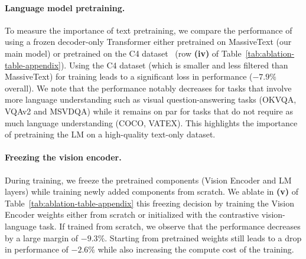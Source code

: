 \paragraph{Language model pretraining.}
To measure the importance of text pretraining, we compare the performance of using a frozen decoder-only Transformer either pretrained on MassiveText (our main model) or pretrained on the C4 dataset~\citep{t5} (row \textbf{(iv)} of Table~\ref{tab:ablation-table-appendix}).
Using the C4 dataset (which is smaller and less filtered than MassiveText) for training leads to a significant loss in performance ($-7.9\%$ overall).
We note that the performance notably decreases for tasks that involve more language understanding such as visual question-answering tasks (OKVQA, VQAv2 and MSVDQA) while it remains on par for tasks that do not require as much language understanding (COCO, VATEX).
This highlights the importance of pretraining the LM on a high-quality text-only dataset.


\paragraph{Freezing the vision encoder.} %
During \method{} training, we freeze the pretrained components (Vision Encoder and LM layers) while training newly added components from scratch.
We ablate in \textbf{(v)} of Table~\ref{tab:ablation-table-appendix} this freezing decision by training the Vision Encoder weights either from scratch or initialized with the contrastive vision-language task.
If trained from scratch, we observe that the performance decreases by a large margin of $-9.3\%$.
Starting from pretrained weights still leads to a drop in performance of $-2.6\%$ while also increasing the compute cost of the training.


